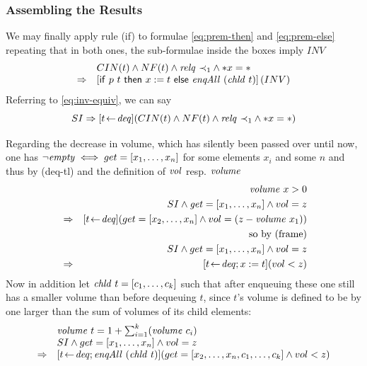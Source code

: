 \subsubsection{Assembling the Results}

We may finally apply rule (if) to formulae \eqref{eq:prem-then} and
\eqref{eq:prem-else} repeating that in both ones, the sub-formulae inside the
boxes imply $INV$
\begin{equation}
\label{eq:concl-if}
\begin{array}{l@{\quad}l}
&  CIN(t) \land NF(t) \land \relq~{\prec}_1 \land \rd{x} =  \unit \\
\Rightarrow & \PDLBox{\IfTerm{p\ t}{x:=t}{\enqAll~(\chld\ t)}}(INV)
\end{array}
\end{equation}
Referring to \eqref{eq:inv-equiv}, we can say
\begin{equation}
\label{eq:si-deq}
SI \Rightarrow [t \!\gets\! \mathit{deq}](CIN(t) \land NF(t) \land \mathit{relq}~{\prec}_1 \land {\ast x} =  \ast )
\end{equation}

Regarding the decrease in volume, which has silently been passed over until now,
one has $\lnot \mathit{empty} \iff get = [x_1,\ldots,x_n]$ for some elements $x_i$ and some $n$ and
thus by (deq-tl) and the definition of $\mathit{vol}$ resp. $\mathit{volume}$
\begin{eqnarray}
\label{eq:then-vol}
&& \mathit{volume}\ x > 0 \nonumber \\
&& SI \land \mathit{get} = [x_1,\ldots,x_n] \land vol = z \nonumber \\ {}
& \Rightarrow &[t \!\gets\! \mathit{deq}](get = [x_2,\ldots,x_n] \land vol = (z - \mathit{volume}\ x_1))
    \nonumber \\
&& \text{so by (frame)} \nonumber\\
& & SI \land get = [x_1,\ldots,x_n] \land vol = z \\
&\Rightarrow& [t \!\gets\! \mathit{deq}; x:= t](vol < z) \nonumber
\end{eqnarray}
Now in addition let $\mathit{chld}~t = [c_1,\ldots,c_k]$ such that after enqueuing these one
still has a smaller volume than before dequeuing $t$, since $t$'s volume is
defined to be by one larger than the sum of volumes of its child elements:
\begin{equation}
\label{eq:else-vol}
\begin{array}{ll}
& \mathit{volume}\ t = 1 + \sum_{i=1}^{k}(\mathit{volume}\ c_i)\\
& SI \land get = [x_1,\ldots,x_n] \land vol = z \\
\Rightarrow & [t \!\gets\! \mathit{deq}; \mathit{enqAll}~(\mathit{chld}~t)](get = [x_2,\ldots,x_n,c_1,\ldots,c_k] \land vol < z)
\end{array}
\end{equation}

